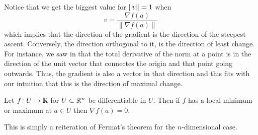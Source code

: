 \documentclass[11pt,a4paper]{article}
\begin{document}
\begin{remark}
  Notice that we get the biggest value for $\left\lVert v\right\rVert = 1$ when
  \[
    v = \frac{\nabla f(a)}{\|\nabla f(a)\|}
  \]
  which implies that the direction
  of the gradient is the direction of the steepest ascent. Conversely,
  the direction orthogonal to it, is the direction of least change.
  For instance, we saw in  that
  the total derivative of the norm at a point is in the direction of the unit
  vector that connectes the origin and that point going outwards.
  Thus, the gradient is also a vector in that direction and
  this fits with our intuition that this is the direction of maximal change.
\end{remark}

\begin{proposition}
  Let $f \colon U \to \mathbb{R}$ for $U \subset \mathbb{R}^n$ be differentiable in $U$.
  Then if $f$ has a local minimum or maximum at $a \in U$ then
  $\nabla f(a) = 0$.
\end{proposition}

\begin{remark}
  This is simply a reiteration of Fermat's theorem for the $n$-dimensional
  case.
\end{remark}
\end{document}
